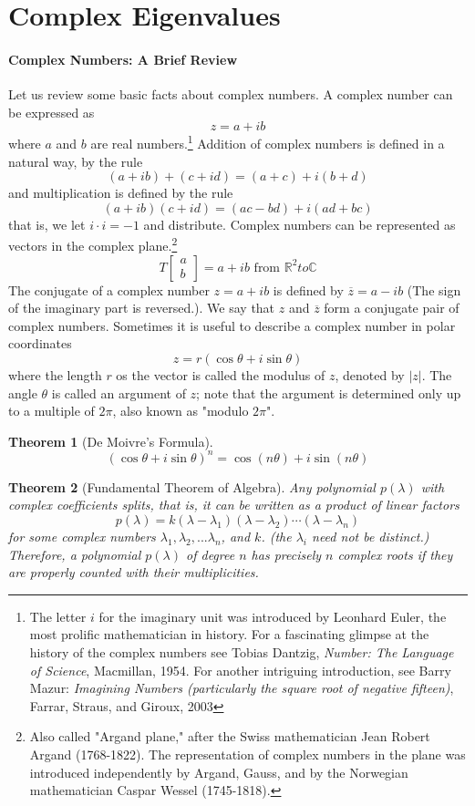 \documentclass[10pt]{report}
\newtheorem{thm2}{Theorem}[section]
\begin{document}
\section{Complex Eigenvalues}
\paragraph{Complex Numbers: A Brief Review}
Let us review some basic facts about complex numbers. A complex number can be expressed as
$$z=a+ib$$
where $a$ and $b$ are real numbers.\footnote{The letter $i$ for the imaginary unit was introduced by Leonhard Euler, the most prolific mathematician in history. For a fascinating glimpse at the history of the complex numbers see Tobias Dantzig, \textit{Number: The Language of Science}, Macmillan, 1954. For another intriguing introduction, see Barry Mazur: \textit{Imagining Numbers (particularly the square root of negative fifteen)}, Farrar, Straus, and Giroux, 2003} Addition of complex numbers is defined in a natural way, by the rule
$$(a+ib)+(c+id)=(a+c)+i(b+d)$$
and multiplication is defined by the rule
$$(a+ib)(c+id)=(ac-bd)+i(ad+bc)$$
that is, we let $i\cdot i=-1$ and distribute.
Complex numbers can be represented as vectors in the complex plane.\footnote{Also called "Argand plane," after the Swiss mathematician Jean Robert Argand (1768-1822). The representation of complex numbers in the plane was introduced independently by Argand, Gauss, and by the Norwegian mathematician Caspar Wessel (1745-1818).}
$$T\left[\begin{array}{c}
a\\
b
\end{array}\right] = a+ib \text{  from  } \mathbb{R}^2 to \mathbb{C}$$
The conjugate of a complex number $z=a+ib$ is defined by $\overline{z}=a-ib$ (The sign of the imaginary part is reversed.). We say that $z$ and $\overline{z}$ form a conjugate pair of complex numbers. Sometimes it is useful to describe a complex number in polar coordinates
$$z=r(\cos\theta + i\sin\theta)$$
where the length $r$ os the vector is called the modulus of $z$, denoted by $|z|$. The angle $\theta$ is called an argument of $z$; note that the argument is determined only up to a multiple of $2\pi$, also known as "modulo $2\pi$".

\begin{thm2}[De Moivre's Formula]
$$(\cos\theta + i\sin\theta)^n = \cos(n\theta)+i\sin(n\theta)$$
\end{thm2}
\begin{thm2}[Fundamental Theorem of Algebra]
Any polynomial $p(\lambda)$ with complex coefficients splits, that is, it can be written as a product of linear factors
$$p(\lambda) = k(\lambda-\lambda_1) (\lambda-\lambda_2)\cdots (\lambda-\lambda_n)$$
for some complex numbers $\lambda_1, \lambda_2,...\lambda_n$, and $k$. (the $\lambda_i$ need not be distinct.)\\
Therefore, a polynomial $p(\lambda)$ of degree $n$ has precisely $n$ complex roots if they are properly counted with their multiplicities.
\end{thm2}
\end{document}
